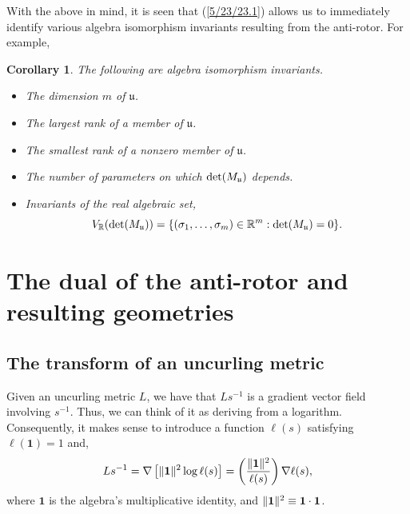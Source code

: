 \documentclass{amsart}
\newtheorem{corollary}[theorem]{Corollary}
\theoremstyle{definition}
\numberwithin{theorem}{section}
\numberwithin{equation}{section}
\begin{document}
   With the above in mind, it is seen that (\ref{5/23/23.1}) allows us to immediately identify various algebra isomorphism invariants resulting from the anti-rotor. For example,
      
       
  \begin{corollary}\label{8/18/23.2} The following are algebra isomorphism invariants. \begin{itemize} \item The dimension $m$ of $\mathfrak{u}$.   \item The largest rank  of a member of $\mathfrak{u}$.  \item The smallest rank of a nonzero member of $\mathfrak{u}$. \item The number of parameters on which ${\rm det}(M_{\mathfrak{u}})$ depends. \item Invariants of the real algebraic set, \[V_\mathbb{R}({\rm det}(M_{\mathfrak{u}})) = \{(\sigma_1,\dots,\sigma_m)\in\mathbb{R}^m: {\rm det}(M_{\mathfrak{u}}) = 0 \}.\] \end{itemize} \end{corollary}
   
  \section{The dual of the anti-rotor and resulting geometries} 
  \subsection{The transform of an uncurling metric}
  

 Given an uncurling metric $L$, we have that $Ls^{-1}$ is a gradient vector field involving $s^{-1}$.  Thus, we can think of it as deriving from a logarithm.  Consequently, it makes sense to introduce a function $\ell(s)$ satisfying $\ell(\mathbf{1})=1$ and,
  \begin{equation}\label{11/7/20.1} Ls^{-1}  = \nabla\left[\|{\bf 1}\|^2\log  \ell(s)\right] =   \left(\frac{\|{\bf 1}\|^2}{ \ell(s)}\right)\nabla \ell(s),\end{equation} where $\mathbf{1}$ is the algebra's multiplicative identity, and $\|{\bf 1}\|^2 \equiv {\bf 1}\cdot {\bf 1}$. 
\end{document}
